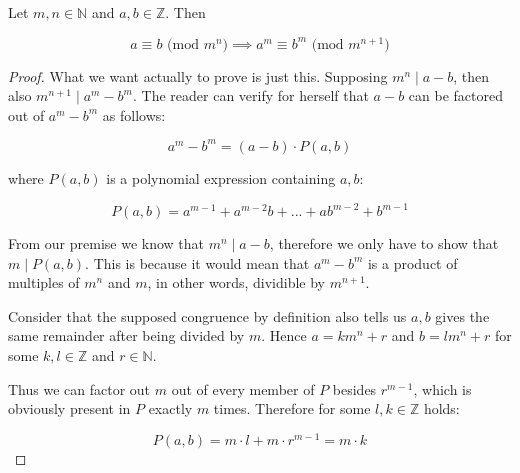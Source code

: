 \documentclass{article}
\title{}
\author{Adam Fiedler}
\begin{document}
\maketitle

Let $m, n \in \mathbb{N}$ and $a, b \in \mathbb{Z}$. Then

\[ a \equiv b \text{ (mod $m^n$)} \implies a^m \equiv b^m \text{ (mod $m^{n+1}$)}  \]

\begin{proof}

What we want actually to prove is just this. Supposing $m^n \mid a - b$, then also $m^{n+1} \mid a^m - b^m$. The reader can verify for herself that $a - b$ can be factored out of $a^m - b^m$ as follows:

\[ a^m - b^m = (a - b) \cdot P(a, b) \]

where $P(a, b)$ is a polynomial expression containing $a, b$:

\[ P(a, b) = a^{m-1} + a^{m-2}b + ... + ab^{m-2} + b^{m-1}  \]

From our premise we know that $m^n \mid a - b$, therefore we only have to show that $m \mid P(a, b)$. This is because it would mean that $a^m - b^m$ is a product of multiples of $m^n$ and $m$, in other words, dividible by $m^{n+1}$.

Consider that the supposed congruence by definition also tells us $a, b$ gives the same remainder after being divided by $m$. Hence $a = km^n + r$ and $b = lm^n + r$ for some $k, l \in \mathbb{Z}$ and $r \in \mathbb{N}$. 

Thus we can factor out $m$ out of every member of $P$ besides $r^{m-1}$, which is obviously present in $P$ exactly $m$ times. Therefore for some $l, k \in \mathbb{Z}$ holds:

\[ P(a, b) = m \cdot l + m \cdot r^{m-1} = m \cdot k \]

\end{proof}
\end{document}
